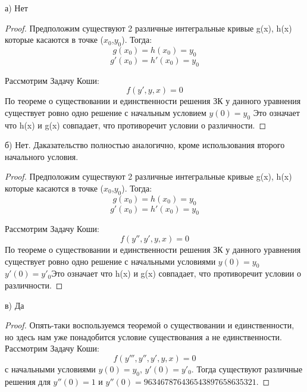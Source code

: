 \documentclass{article}
\begin{document}
а) Нет 
\begin{proof} Предположим существуют 2 различные интегральные кривые g(x), h(x) которые касаются в точке ($x_0$,$y_0$). Тогда:
\begin{equation}
g(x_0)=h(x_0)=y_0
\end{equation}
\begin{equation}
g'(x_0)=h'(x_0)=y_0  
\end{equation}

Рассмотрим Задачу Коши:
\begin{equation}
f(y',y,x)=0
\end{equation}
По теореме о существовании и единственности решения ЗК у данного уравнения существует ровно одно решение с начальным условием $y(0)=y_0$ Это означает что h(x) и g(x) совпадает, что противоречит условии о различности. 
\end{proof}
б) Нет. Даказательство полностью аналогично, кроме использования второго начального условия.  
\begin{proof} Предположим существуют 2 различные интегральные кривые g(x), h(x) которые касаются в точке ($x_0$,$y_0$). Тогда:
\begin{equation}
g(x_0)=h(x_0)=y_0
\end{equation}
\begin{equation}
g'(x_0)=h'(x_0)=y_0  
\end{equation}

Рассмотрим Задачу Коши:
\begin{equation}
f(y'',y',y,x)=0
\end{equation}
По теореме о существовании и единственности решения ЗК у данного уравнения существует ровно одно решение с начальными условиями $y(0)=y_0$ $y'(0)=y'_0$Это означает что h(x) и g(x) совпадает, что противоречит условии о различности. 
\end{proof}
в) Да
\begin{proof}
Опять-таки воспользуемся теоремой о существовании и единственности, но здесь нам уже понадобится условие существования а не единственности.
Рассмотрим Задачу Коши:
\begin{equation}
f(y''',y'',y',y,x)=0 
\end{equation}
с начальными условиями $y(0)=y_0$, $y'(0)=y'_0$. Тогда существуют различные решения для $y''(0)=1$ и $y''(0)=963467876436543897658635321$. 
\end{proof}
\end{document}
